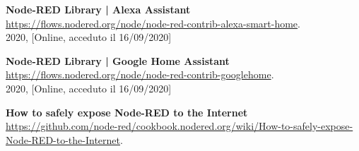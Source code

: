 \documentclass[a4paper,10pt]{memoir}
\begin{document}
\begin{thebibliography}{9}
    \textbf{Node-RED Library | Alexa Assistant}
    \\
    \href{https://flows.nodered.org/node/node-red-contrib-alexa-smart-home}{https://flows.nodered.org/node/node-red-contrib-alexa-smart-home}.
    \\
    2020, [Online, acceduto il 16/09/2020]

    \textbf{Node-RED Library | Google Home Assistant}
    \\
    \href{https://flows.nodered.org/node/node-red-contrib-googlehome}{https://flows.nodered.org/node/node-red-contrib-googlehome}.
    \\
    2020, [Online, acceduto il 16/09/2020]

    \textbf{How to safely expose Node-RED to the Internet}
    \\
    \href{https://github.com/node-red/cookbook.nodered.org/wiki/How-to-safely-expose-Node-RED-to-the-Internet}{https://github.com/node-red/cookbook.nodered.org/wiki/How-to-safely-expose-Node-RED-to-the-Internet}.

\end{thebibliography}
\end{document}
